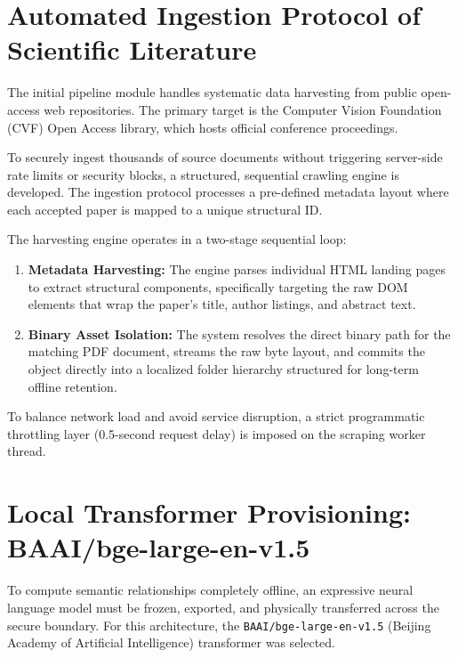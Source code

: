 \documentclass[12pt,a4paper]{article}
\begin{document}
\section{Automated Ingestion Protocol of Scientific Literature}
The initial pipeline module handles systematic data harvesting from public open-access web repositories. The primary target is the Computer Vision Foundation (CVF) Open Access library, which hosts official conference proceedings.

To securely ingest thousands of source documents without triggering server-side rate limits or security blocks, a structured, sequential crawling engine is developed. The ingestion protocol processes a pre-defined metadata layout where each accepted paper is mapped to a unique structural ID. 

The harvesting engine operates in a two-stage sequential loop:
\begin{enumerate}
    \item \textbf{Metadata Harvesting:} The engine parses individual HTML landing pages to extract structural components, specifically targeting the raw DOM elements that wrap the paper's title, author listings, and abstract text.
    \item \textbf{Binary Asset Isolation:} The system resolves the direct binary path for the matching PDF document, streams the raw byte layout, and commits the object directly into a localized folder hierarchy structured for long-term offline retention.
\end{enumerate}

To balance network load and avoid service disruption, a strict programmatic throttling layer (0.5-second request delay) is imposed on the scraping worker thread.

\section{Local Transformer Provisioning: BAAI/bge-large-en-v1.5}
To compute semantic relationships completely offline, an expressive neural language model must be frozen, exported, and physically transferred across the secure boundary. For this architecture, the \texttt{BAAI/bge-large-en-v1.5} (Beijing Academy of Artificial Intelligence) transformer was selected.
\end{document}
